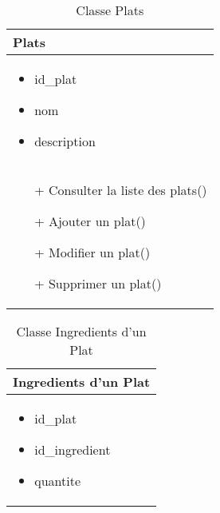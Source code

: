 \begin{table}[H]
    \begin{center}
        \begin{tabular}{|Z{5cm}|}
            \hline
            \textbf{Plats}\\
            \hline
            \begin{itemize}
                \item id\_plat
                \item nom
                \item description
            \end{itemize}\\
            \hline
            \begin{itemize}
                \item[+] Consulter la liste des plats()
                \item[+] Ajouter un plat()
                \item[+] Modifier un plat()
                \item[+] Supprimer un plat()
            \end{itemize}
            \\
            \hline
        \end{tabular}	
        \caption{Classe Plats}
    \end{center}
\end{table}

\begin{table}[H]
    \begin{center}
        \begin{tabular}{|Z{5cm}|}
            \hline
            \textbf{Ingredients d'un Plat}\\
            \hline
            \begin{itemize}
                \item id\_plat
                \item id\_ingredient
                \item quantite
            \end{itemize}\\
            \hline
        \end{tabular}	
        \caption{Classe Ingredients d'un Plat}
    \end{center}
\end{table}

